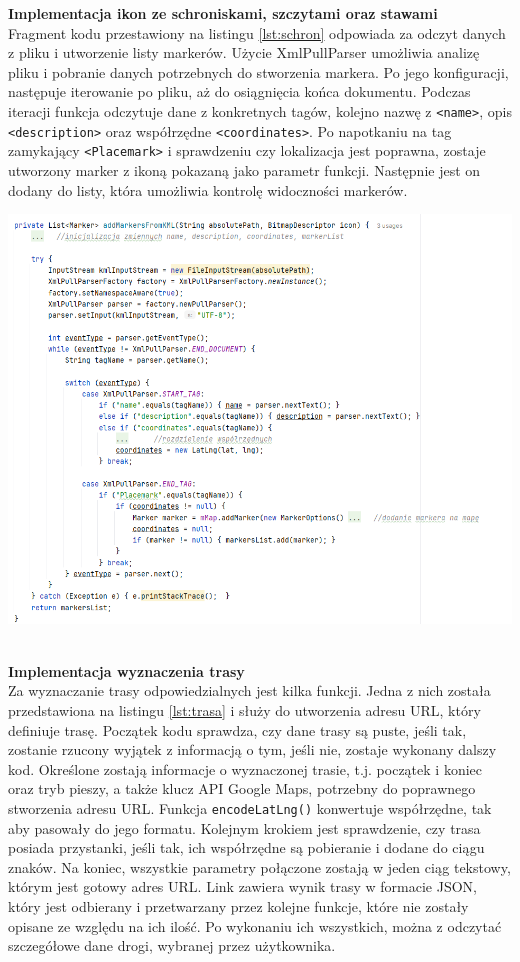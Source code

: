 \textbf{Implementacja ikon ze schroniskami, szczytami oraz stawami} \\ 
Fragment kodu przestawiony na listingu \ref{lst:schron} odpowiada za odczyt danych z pliku i utworzenie listy markerów. Użycie XmlPullParser umożliwia analizę pliku i pobranie danych potrzebnych do stworzenia markera. Po jego konfiguracji, następuje iterowanie po pliku, aż do osiągnięcia końca dokumentu. Podczas iteracji funkcja odczytuje dane z konkretnych tagów, kolejno nazwę z \verb|<name>|, opis \verb|<description>| oraz współrzędne \verb|<coordinates>|. Po napotkaniu na tag zamykający \verb|<Placemark>| i sprawdzeniu czy lokalizacja jest poprawna, zostaje utworzony marker z ikoną pokazaną jako parametr funkcji. Następnie jest on dodany do listy, która umożliwia kontrolę widoczności markerów. \\

\noindent
\begin{minipage}{\linewidth}
    \label{lst:schron}
    \centering
    \includegraphics[width=0.6\linewidth]{img/kod/schroniska.png}
\end{minipage}\\


\textbf{Implementacja wyznaczenia trasy}\\

Za wyznaczanie trasy odpowiedzialnych jest kilka funkcji. Jedna z nich została przedstawiona na listingu \ref{lst:trasa} i służy do utworzenia adresu URL, który definiuje trasę. Początek kodu sprawdza, czy dane trasy są puste, jeśli tak, zostanie rzucony wyjątek z informacją o tym, jeśli nie, zostaje wykonany dalszy kod. Określone zostają informacje o wyznaczonej trasie, t.j. początek i koniec oraz tryb pieszy, a także klucz API Google Maps, potrzebny do poprawnego stworzenia adresu URL. Funkcja \verb|encodeLatLng()| konwertuje współrzędne, tak aby pasowały do jego formatu. Kolejnym krokiem jest sprawdzenie, czy trasa posiada przystanki, jeśli tak, ich współrzędne są pobieranie i dodane do ciągu znaków. Na koniec, wszystkie parametry połączone zostają w jeden ciąg tekstowy, którym jest gotowy adres URL. Link zawiera wynik trasy w formacie JSON, który jest odbierany i przetwarzany przez kolejne funkcje, które nie zostały opisane ze względu na ich ilość. Po wykonaniu ich wszystkich, można z odczytać szczegółowe dane drogi, wybranej przez użytkownika. \\

